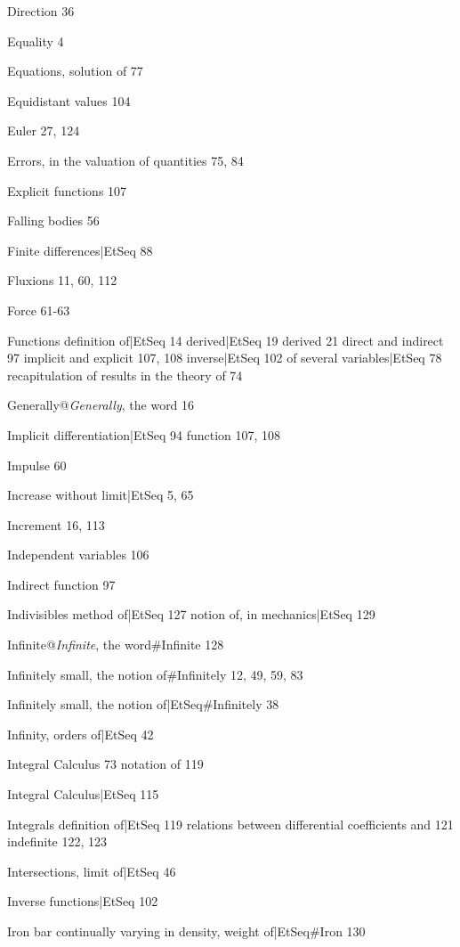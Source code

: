 \documentclass[12pt]{book}[2005/09/16]
\newcommand{\Pagelabel}[1]{\phantomsection\label{page:#1}}
\newcommand{\PageSep}[1]{\Pagelabel{#1}\ignorespaces}
\renewcommand{\(}{{\upshape(}}
\renewcommand{\)}{{\upshape)}}
\begin{document}
Direction 36

Equality 4

Equations, solution of 77

Equidistant values 104

Euler 27, 124

Errors, in the valuation of quantities 75, 84

Explicit functions 107

Falling bodies 56

Finite differences|EtSeq 88 %

Fluxions 11, 60, 112

Force 61-63

Functions
  definition of|EtSeq 14 %
  derived|EtSeq 19 %
  derived 21
  direct and indirect 97
  implicit and explicit 107, 108
  inverse|EtSeq 102 %
  of several variables|EtSeq 78 %
  recapitulation of results in the theory of 74

Generally@\emph{Generally}, the word 16

Implicit
  differentiation|EtSeq 94 %
  function 107, 108

Impulse 60

Increase without limit|EtSeq 5, 65 %

Increment 16, 113
\PageSep{144}

Independent variables 106

Indirect function 97

Indivisibles
  method of|EtSeq 127 %
  notion of, in mechanics|EtSeq 129 %

Infinite@\emph{Infinite}, the word#Infinite 128

Infinitely small, the notion of#Infinitely 12, 49, 59, 83

Infinitely small, the notion of|EtSeq#Infinitely 38 %

Infinity, orders of|EtSeq 42 %

Integral Calculus 73
  notation of 119

Integral Calculus|EtSeq 115 %

Integrals
  definition of|EtSeq 119 %
  relations between differential coefficients and 121
  indefinite 122, 123

Intersections, limit of|EtSeq 46 %

Inverse functions|EtSeq 102 %

Iron bar continually varying in density, weight of|EtSeq#Iron 130 %
\end{document}
